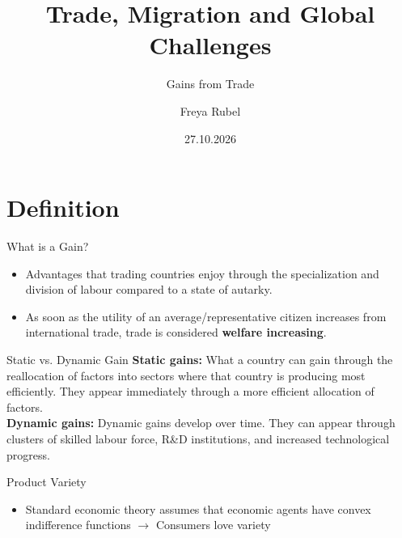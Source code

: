 \documentclass{beamer}
\author{Freya Rubel}
\title{Trade, Migration and Global Challenges}
\subtitle{Gains from Trade}
\institute{}
\date{27.10.2026}
\begin{document}
\begin{frame}
    \titlepage
\end{frame}

\begin{frame}
    \tableofcontents[sectionstyle=show, subsectionstyle=show/shaded/hide, subsubsectionstyle=show/shaded/hide]
\end{frame}

\section{Definition}
\begin{frame}{What is a Gain?}
\begin{itemize} 
    \item Advantages that trading countries enjoy through the specialization and division of labour compared to a state of autarky.
    \item As soon as the utility of an average/representative citizen increases from international trade, trade is considered \textbf{welfare increasing}. 
\end{itemize}
\end{frame}

 \begin{frame}{Static vs. Dynamic Gain}
\textbf{Static gains:} What a country can gain through the reallocation of factors into sectors where that country is producing most efficiently. They appear immediately through a more efficient allocation of factors. \vspace{0.1cm}\\ \pause
\textbf{Dynamic gains:} Dynamic gains develop over time. They can appear through clusters of skilled labour force, R\&D institutions, and increased technological progress.  
\end{frame}

\begin{frame}[t]{Product Variety}
\begin{itemize}
    \item Standard economic theory assumes that economic agents have convex indifference functions $\rightarrow$ Consumers love variety 
\end{itemize}
\end{frame}
\end{document}
